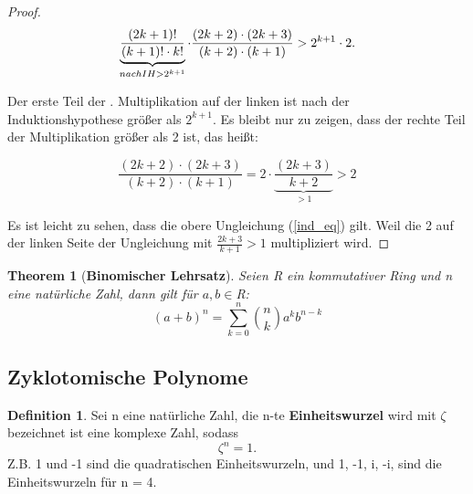 \documentclass[12pt,oneside]{article}
\newtheorem{theorem}{Theorem}[section]
\theoremstyle{remark}
\theoremstyle{definition}
\newtheorem{definition}{Definition}[section]
\begin{document}
\begin{flushleft}
\begin{flushleft}
\begin{proof}
\begin{equation}
     \underbrace{\frac{(2k + 1)!}{(k + 1)! \cdot k!}}_{nach IH > 2^{k + 1}} \cdot \frac{(2k + 2) \cdot (2k + 3)}{(k + 2) \cdot (k + 1)} > 2^{k+1} \cdot 2.\newline\newline
\end{equation}

Der erste Teil der . Multiplikation auf der linken ist nach der Induktionshypothese größer als $2^{k+1}$. Es bleibt nur zu zeigen, dass der rechte Teil der Multiplikation größer als 2 ist, das heißt: \newline\newline

\begin{equation}\label{ind_eq}
\frac{(2k + 2) \cdot (2k + 3)}{(k + 2) \cdot (k + 1)} = 2 \cdot \underbrace{\frac{(2k + 3 )}{k + 2}}_{ > 1} > 2
\end{equation}

Es ist leicht zu sehen, dass die obere Ungleichung (\ref{ind_eq}) gilt. Weil die 2 auf der linken Seite der Ungleichung mit $\frac{2k + 3}{k + 1} > 1$ multipliziert wird.


\end{proof}

\end{flushleft}
\smallskip 

\begin{theorem}[\textbf{Binomischer Lehrsatz}]\label{Th_3}
Seien R ein kommutativer Ring und n eine natürliche Zahl, dann gilt für $a,b \in $R:\newline\newline
 \begin{equation}
     (a + b)^n  = \sum_{k=0}^n {n \choose k} a^k b^{n-k}
 \end{equation}
\end{theorem}

\smallskip

\end{flushleft}


\subsection{Zyklotomische Polynome}

\begin{definition}
Sei n eine natürliche Zahl, die n-te \textbf{Einheitswurzel} wird mit $\zeta$ bezeichnet ist eine komplexe Zahl, sodass
\begin{equation}
    \zeta^n = 1.
\end{equation}
Z.B. 1 und -1 sind die quadratischen Einheitswurzeln, und 1, -1, i, -i, sind die Einheitswurzeln für n = 4.    
\end{definition}
\end{document}
